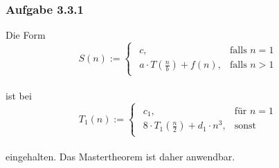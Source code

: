 \documentclass{article}
\begin{document}
\subsubsection{Aufgabe 3.3.1}
    Die Form\\
    \[
	S(n) :=  \begin{cases}
	    	\begin{array}{ll}
    			c, & \text{falls }n=1\\
				a \cdot T(\frac{n}{b})+f(n), &\text{falls }n>1
			\end{array}
		\end{cases}
   	\]
   	\\
   	ist bei\\
   	\[
	T_1(n) := \begin{cases}
				\begin{array}{ll}
					c_1,			& \text{für }n=1\\
					8 \cdot T_1(\frac{n}{2})+d_1\cdot n^3, & \text{sonst}
				\end{array}
			\end{cases}
   	\]
   	\\
   	eingehalten. Das Mastertheorem ist daher anwendbar.\\
   	\\
\end{document}
